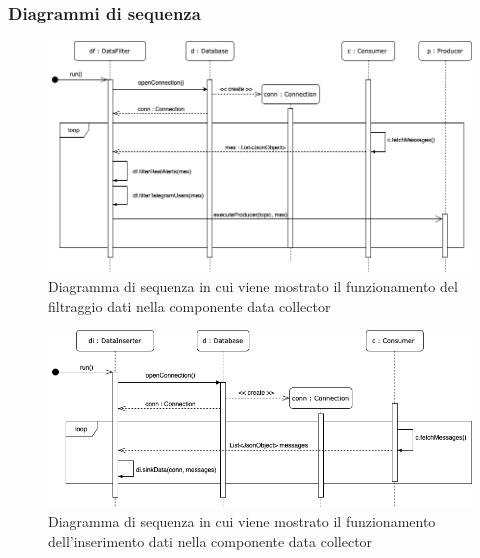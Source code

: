 	\begin{landscape}
	\subsubsection{Diagrammi di sequenza}%
		\begin{figure}[H]
			\centering
			\includegraphics[scale=0.550]{res/images/DATACOLLECTOR/DataFilter.ThreadsKafkaDataCollector.png}
			\caption{Diagramma di sequenza in cui viene mostrato il funzionamento del filtraggio dati nella componente data collector}
			\label{Diagramma 7}
		\end{figure}
		\begin{figure}[H]
			\centering
			\includegraphics[scale=0.550]{res/images/DATACOLLECTOR/DataInserter.ThreadsKafkaDataCollector.png}
			\caption{Diagramma di sequenza in cui viene mostrato il funzionamento dell'inserimento dati nella componente data collector}
			\label{Diagramma 8}
		\end{figure}
	\end{landscape}